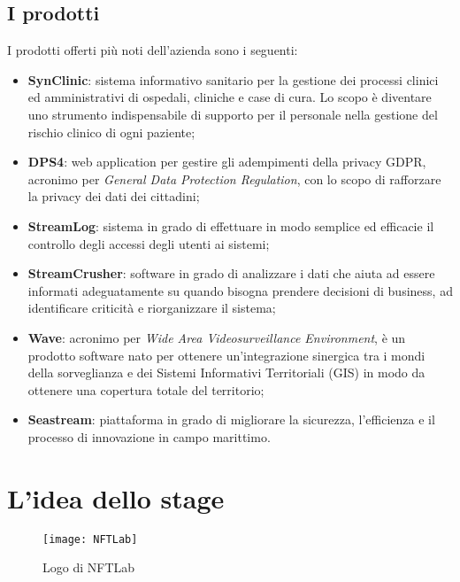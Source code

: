 \subsection{I prodotti}

I prodotti offerti più noti dell'azienda sono i seguenti:
\begin{itemize}
	\item \textbf{SynClinic}: sistema informativo sanitario per la gestione dei processi clinici ed amministrativi di ospedali, cliniche e case di cura. Lo scopo è diventare uno strumento indispensabile di supporto per il personale nella gestione del rischio clinico di ogni paziente;
	\item \textbf{DPS4}: web application per gestire gli adempimenti della privacy GDPR, acronimo per \textit{General Data Protection Regulation}, con lo scopo di rafforzare la privacy dei dati dei cittadini;
	\item \textbf{StreamLog}: sistema in grado di effettuare in modo semplice ed efficacie il controllo degli accessi degli utenti ai sistemi;
	\item \textbf{StreamCrusher}: software in grado di analizzare i dati che aiuta ad essere informati adeguatamente su quando bisogna prendere decisioni di business, ad identificare criticità e riorganizzare il sistema;
	\item \textbf{Wave}: acronimo per \textit{Wide Area Videosurveillance Environment}, è un prodotto software nato per ottenere un'integrazione sinergica tra i mondi della sorveglianza e dei Sistemi Informativi Territoriali (GIS) in modo da ottenere una copertura totale del territorio;
	\item \textbf{Seastream}: piattaforma in grado di migliorare la sicurezza, l'efficienza e il processo di innovazione in campo marittimo.
\end{itemize}

\section{L'idea dello stage}

\begin{figure}[H]
	\begin{center}
		\texttt{[image: NFTLab]}
		\caption{Logo di NFTLab}
	\end{center}
\end{figure}

